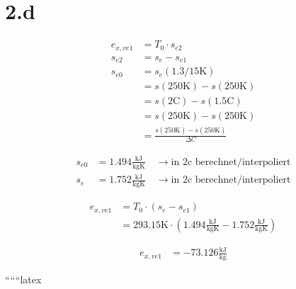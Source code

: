 \section*{2.d}

\begin{align*}
e_{x,ve1} &= T_0 \cdot s_{e2} \\
s_{e2} &= s_{e} - s_{e1} \\
s_{e0} &= s_{e}(1.3/15\text{K}) \\
&= s(250\text{K}) - s(250\text{K}) \\
&= s(2\text{C}) - s(1.5\text{C}) \\
&= s(250\text{K}) - s(250\text{K}) \\
&= \frac{s(250\text{K}) - s(250\text{K})}{\Delta C}
\end{align*}

\begin{align*}
s_{e0} &= 1.494 \frac{\text{kJ}}{\text{kgK}} \quad \rightarrow \text{in 2c berechnet/interpoliert} \\
s_{e} &= 1.752 \frac{\text{kJ}}{\text{kgK}} \quad \rightarrow \text{in 2c berechnet/interpoliert}
\end{align*}

\begin{align*}
e_{x,ve1} &= T_0 \cdot (s_{e} - s_{e1}) \\
&= 293.15\text{K} \cdot (1.494 \frac{\text{kJ}}{\text{kgK}} - 1.752 \frac{\text{kJ}}{\text{kgK}})
\end{align*}

\begin{align*}
e_{x,ve1} &= -73.126 \frac{\text{kJ}}{\text{kg}}
\end{align*}

``````latex